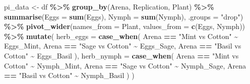 \documentclass[
]{article}
\newenvironment{Shaded}{\begin{snugshade}}{\end{snugshade}}
\newcommand{\AttributeTok}[1]{\textcolor[rgb]{0.13,0.29,0.53}{#1}}
\newcommand{\FunctionTok}[1]{\textcolor[rgb]{0.13,0.29,0.53}{\textbf{#1}}}
\newcommand{\NormalTok}[1]{#1}
\newcommand{\OtherTok}[1]{\textcolor[rgb]{0.56,0.35,0.01}{#1}}
\newcommand{\SpecialCharTok}[1]{\textcolor[rgb]{0.81,0.36,0.00}{\textbf{#1}}}
\newcommand{\StringTok}[1]{\textcolor[rgb]{0.31,0.60,0.02}{#1}}
\begin{document}
\begin{Shaded}
\begin{Highlighting}[]
\NormalTok{pi\_data }\OtherTok{\textless{}{-}}\NormalTok{ df }\SpecialCharTok{\%\textgreater{}\%}
  \FunctionTok{group\_by}\NormalTok{(Arena, Replication, Plant) }\SpecialCharTok{\%\textgreater{}\%}
  \FunctionTok{summarise}\NormalTok{(}\AttributeTok{Eggs =} \FunctionTok{sum}\NormalTok{(Eggs), }\AttributeTok{Nymph =} \FunctionTok{sum}\NormalTok{(Nymph), }\AttributeTok{.groups =} \StringTok{"drop"}\NormalTok{) }\SpecialCharTok{\%\textgreater{}\%}
  \FunctionTok{pivot\_wider}\NormalTok{(}\AttributeTok{names\_from =}\NormalTok{ Plant, }\AttributeTok{values\_from =} \FunctionTok{c}\NormalTok{(Eggs, Nymph)) }\SpecialCharTok{\%\textgreater{}\%}
  \FunctionTok{mutate}\NormalTok{(}
    \AttributeTok{herb\_eggs =} \FunctionTok{case\_when}\NormalTok{(}
\NormalTok{      Arena }\SpecialCharTok{==} \StringTok{"Mint vs Cotton"} \SpecialCharTok{\textasciitilde{}}\NormalTok{ Eggs\_Mint,}
\NormalTok{      Arena }\SpecialCharTok{==} \StringTok{"Sage vs Cotton"} \SpecialCharTok{\textasciitilde{}}\NormalTok{ Eggs\_Sage,}
\NormalTok{      Arena }\SpecialCharTok{==} \StringTok{"Basil vs Cotton"} \SpecialCharTok{\textasciitilde{}}\NormalTok{ Eggs\_Basil}
\NormalTok{    ),}
    \AttributeTok{herb\_nymph =} \FunctionTok{case\_when}\NormalTok{(}
\NormalTok{      Arena }\SpecialCharTok{==} \StringTok{"Mint vs Cotton"} \SpecialCharTok{\textasciitilde{}}\NormalTok{ Nymph\_Mint,}
\NormalTok{      Arena }\SpecialCharTok{==} \StringTok{"Sage vs Cotton"} \SpecialCharTok{\textasciitilde{}}\NormalTok{ Nymph\_Sage,}
\NormalTok{      Arena }\SpecialCharTok{==} \StringTok{"Basil vs Cotton"} \SpecialCharTok{\textasciitilde{}}\NormalTok{ Nymph\_Basil}
\NormalTok{    )}
\NormalTok{  )}



\end{Highlighting}
\end{Shaded}
\end{document}
